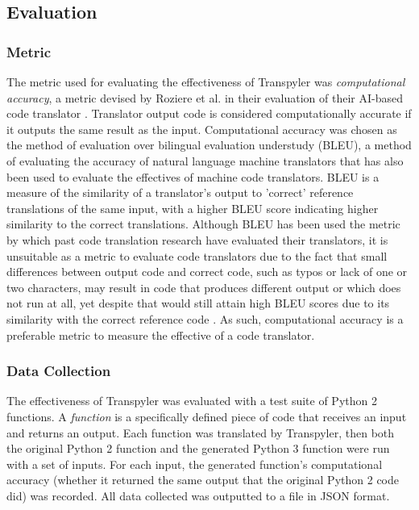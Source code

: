 \subsection{Evaluation}
\subsubsection{Metric}
The metric used for evaluating the effectiveness of Transpyler was \textit{computational accuracy}, a metric devised by Roziere et al. in their evaluation of their AI-based code translator \autocite{Roziere}. Translator output code is considered computationally accurate if it outputs the same result as the input. Computational accuracy was chosen as the method of evaluation over bilingual evaluation understudy (BLEU), a method of evaluating the accuracy of natural language machine translators that has also been used to evaluate the effectives of machine code translators. BLEU is a measure of the similarity of a translator's output to 'correct' reference translations of the same input, with a higher BLEU score indicating higher similarity to the correct translations. Although BLEU has been used the metric by which past code translation research have evaluated their translators, it is unsuitable as a metric to evaluate code translators due to the fact that small differences between output code and correct code, such as typos or lack of one or two characters, may result in code that produces different output or which does not run at all, yet despite that would still attain high BLEU scores due to its similarity with the correct reference code \autocite{Roziere}. As such, computational accuracy is a preferable metric to measure the effective of a code translator.
\subsubsection{Data Collection}
The effectiveness of Transpyler was evaluated with a test suite of Python 2 functions. A \textit{function} is a specifically defined piece of code that receives an input and returns an output. Each function was translated by Transpyler, then both the original Python 2 function and the generated Python 3 function were run with a set of inputs. For each input, the generated function's computational accuracy (whether it returned the same output that the original Python 2 code did) was recorded. All data collected was outputted to a file in JSON format.